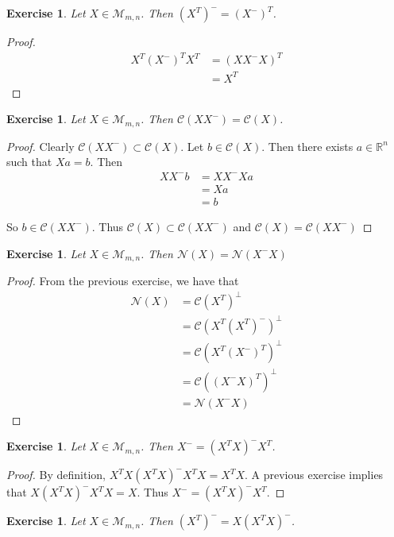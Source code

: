 \documentclass[12pt]{amsart}
\newtheorem{ex}[thm]{Exercise}
\newcommand{\R}{\mathbb{R}}
\newcommand{\MC}{\mathcal{C}}
\newcommand{\MN}{\mathcal{N}}
\newcommand{\MM}{\mathcal{M}}
\newcommand{\z}[1]{Let ${#1} \in \MM_{m,n}$}
\begin{document}
\begin{ex}
\z{X}. Then $(X^T)^- = (X^-)^T$.
\end{ex}

\begin{proof}
\begin{align*}
X^T(X^-)^TX^T
&= (X X^- X)^T\\
&= X^T
\end{align*}
\end{proof}

\begin{ex}
\z{X}. Then $\MC(XX^-) = \MC(X)$. 
\end{ex}

\begin{proof}
Clearly $\MC(XX^-) \subset \MC(X)$. Let $b \in \MC(X)$. Then there exists $a \in \R^n$ such that $Xa = b$. Then 
\begin{align*}
XX^-b 
&= XX^-Xa \\
&= Xa \\
&= b
\end{align*}

So $b \in \MC(XX^-)$. Thus $\MC(X) \subset \MC(XX^-)$ and $\MC(X) = \MC(XX^-)$
\end{proof}

\begin{ex}
\z{X}. Then $\MN(X) = \MN(X^-X)$
\end{ex}

\begin{proof}
From the previous exercise, we have that 
\begin{align*}
\MN(X) 
&= \MC(X^T)^{\perp} \\
&= \MC(X^T(X^T)^-)^{\perp} \\
&= \MC(X^T(X^-)^T)^{\perp} \\
&= \MC((X^-X)^T)^{\perp} \\
&= \MN(X^-X)
\end{align*}
\end{proof}
\vspace{2mm}

\begin{ex}
\z{X}. Then $X^- = (X^TX)^-X^T$. 
\end{ex}

\begin{proof}
By definition, $X^TX (X^TX)^- X^TX = X^TX$. A previous exercise implies that $X(X^TX)^-X^TX = X$. Thus $X^- = (X^TX)^-X^T$.
\end{proof}

\begin{ex}
\z{X}. Then $(X^T)^- = X(X^TX)^-$. 
\end{ex}
\end{document}
